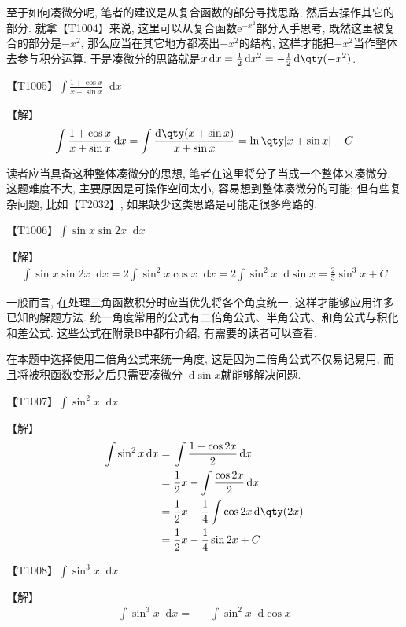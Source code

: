 \documentclass{ctexbook}
\newcommand{\e}{\mathrm{e}}
\newcommand*{\dif}{\mathop{}\!\mathrm{d}}
\begin{document}
{{至于如何凑微分呢, 笔者的建议是从复合函数的部分寻找思路, 然后去操作其它的部分. 就拿{\color{red}【T1004】}来说, 这里可以从复合函数$\e^{-x^{2}}$部分入手思考, 既然这里被复合的部分是$-x^{2}$, 那么应当在其它地方都凑出$-x^{2}$的结构, 这样才能把$-x^{2}$当作整体去参与积分运算. 于是凑微分的思路就是$x\dif{x}=\frac{1}{2}\dif{x^{2}}=-\frac{1}{2}\dif{\qty(-x^{2})}$. \par}
{\color{red}【T1005】}$\int\frac{1+\cos{x}}{x+\sin{x}}\dif{x}$\par
【解】
\begin{align*}
\int\frac{1+\cos{x}}{x+\sin{x}}\dif{x}=\int\frac{\dif{\qty(x+\sin{x})}}{x+\sin{x}}=\ln\qty|x+\sin{x}|+C
\end{align*}\par
{\kaishu 读者应当具备这种整体凑微分的思想, 笔者在这里将分子当成一个整体来凑微分. 这题难度不大, 主要原因是可操作空间太小, 容易想到整体凑微分的可能; 但有些复杂问题, 比如【T2032】, 如果缺少这类思路是可能走很多弯路的. \par}
{\color{red}【T1006】}$\int\sin{x}\sin{2x}\dif{x}$\par
【解】
\begin{align*}
\int\sin{x}\sin{2x}\dif{x}=2\int\sin^{2}{x}\cos{x}\dif{x}=2\int\sin^{2}{x}\dif{\sin{x}}=\frac{2}{3}\sin^{3}{x}+C
\end{align*}\par
{\kaishu 一般而言, 在处理三角函数积分时应当优先将各个角度统一, 这样才能够应用许多已知的解题方法. 统一角度常用的公式有二倍角公式、半角公式、和角公式与积化和差公式. 这些公式在附录B中都有介绍, 有需要的读者可以查看. \par
在本题中选择使用二倍角公式来统一角度, 这是因为二倍角公式不仅易记易用, 而且将被积函数变形之后只需要凑微分$\dif{\sin{x}}$就能够解决问题. \par}
{\color{red}【T1007】}$\int\sin^{2}{x}\dif{x}$\par
【解】
\begin{align*}
\int\sin^{2}{x}\dif{x}={}&\int\frac{1-\cos{2x}}{2}\dif{x}\\
={}&\frac{1}{2}x-\int\frac{\cos{2x}}{2}\dif{x}\\
={}&\frac{1}{2}x-\frac{1}{4}\int\cos{2x}\dif{\qty(2x)}\\
={}&\frac{1}{2}x-\frac{1}{4}\sin{2x}+C
\end{align*}\par
{\color{red}【T1008】}$\int\sin^{3}{x}\dif{x}$\par
【解】
\begin{align*}
\int\sin^{3}{x}\dif{x}={}&-\int\sin^{2}{x}\dif{\cos{x}}\\

\end{align*}}
\end{document}
